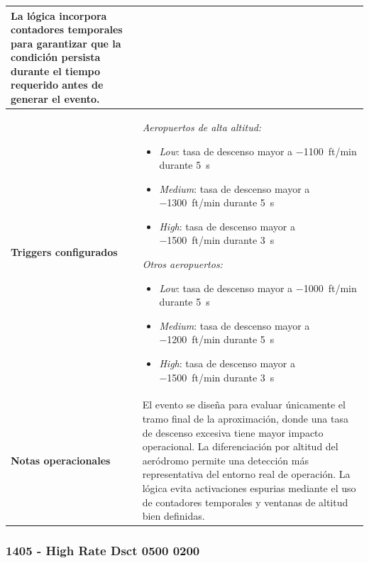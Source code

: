 \documentclass[11pt,a4paper]{article}
\begin{document}
\begin{longtable}{p{5cm} p{9.5cm}}
		La lógica incorpora contadores temporales para garantizar que la condición persista durante el tiempo requerido antes de generar el evento. \\
		\hline
		\textbf{Triggers configurados} &
		\textit{Aeropuertos de alta altitud:}
		\begin{itemize}
			\item \textit{Low}: tasa de descenso mayor a \SI{-1100}{ft/min} durante \SI{5}{s}
			\item \textit{Medium}: tasa de descenso mayor a \SI{-1300}{ft/min} durante \SI{5}{s}
			\item \textit{High}: tasa de descenso mayor a \SI{-1500}{ft/min} durante \SI{3}{s}
		\end{itemize}
		\textit{Otros aeropuertos:}
		\begin{itemize}
			\item \textit{Low}: tasa de descenso mayor a \SI{-1000}{ft/min} durante \SI{5}{s}
			\item \textit{Medium}: tasa de descenso mayor a \SI{-1200}{ft/min} durante \SI{5}{s}
			\item \textit{High}: tasa de descenso mayor a \SI{-1500}{ft/min} durante \SI{3}{s}
		\end{itemize} \\
		\hline
		\textbf{Notas operacionales} &
		El evento se diseña para evaluar únicamente el tramo final de la aproximación, donde una tasa de descenso excesiva tiene mayor impacto operacional. La diferenciación por altitud del aeródromo permite una detección más representativa del entorno real de operación. La lógica evita activaciones espurias mediante el uso de contadores temporales y ventanas de altitud bien definidas. \\
		\hline
	\end{longtable}
	
	\subsubsection{1405 - High Rate Dsct 0500 0200}
	
\end{document}
